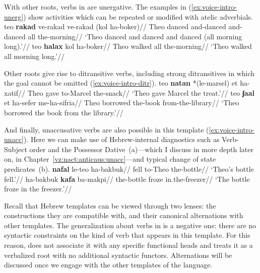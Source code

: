 With other roots, verbs in {\tkal} are unergative. The examples in (\ref{ex:voice-intro-unerg}) show activities which can be repeated or modified with atelic adverbials.
\pex\label{ex:voice-intro-unerg}
	\a \begingl
		\gla teo \textbf{rakad} ve-rakad ve-rakad (kol ha-boker)//
		\glb Theo danced and-danced and-danced all the-morning//
		\glft `Theo danced and danced and danced (all morning long).'//
	\endgl
	\a \begingl
		\gla teo \textbf{halax} kol ha-boker//
		\glb Theo walked all the-morning//
		\glft `Theo walked all morning long.'//
	\endgl
\xe

Other roots give rise to ditransitive verbs, including strong ditransitives in which the goal cannot be omitted (\ref{ex:voice-intro-ditr}).
\pex\label{ex:voice-intro-ditr}
	\a \begingl
		\gla teo \textbf{natan} *(le-marsel) et ha-xatif//
		\glb Theo gave to-Marcel   the-snack//
		\glft `Theo gave Marcel the treat.'//
	\endgl
	\a \begingl
		\gla teo \textbf{ʃaal} et ha-sefer me-ha-sifria//
		\glb Theo borrowed  the-book from-the-library//
		\glft `Theo borrowed the book from the library.'//
	\endgl
\xe

And finally, unaccusative verbs are also possible in this template (\ref{ex:voice-intro-unacc}). Here we can make use of Hebrew-internal diagnostics such as Verb-Subject order and the Possessor Dative~(\nextx a)---which I discuss in more depth later on, in Chapter~\ref{vz:nact:anticaus:unacc}---and typical change of state predicates~(\nextx b).
\pex\label{ex:voice-intro-unacc}
	\a \begingl
		\gla \textbf{nafal} le-teo ha-bakbuk//
		\glb fell to-Theo the-bottle//
		\glft `Theo's bottle fell.'//
	\endgl
	\a \begingl
		\gla ha-bakbuk \textbf{kafa} ba-makpi//
		\glb the-bottle froze in.the-freezer//
		\glft `The bottle froze in the freezer.'//
	\endgl
\xe

Recall that Hebrew templates can be viewed through two lenses: the constructions they are compatible with, and their canonical alternations with other templates. The generalization about verbs in {\tkal} is a negative one: there are no syntactic constraints on the kind of verb that appears in this template. For this reason, \cite{doron03} does not associate it with any specific functional heads and \cite{borer13oup,borer15roots} treats it as a verbalized root with no additional syntactic functors. Alternations will be discussed once we engage with the other templates of the language.


